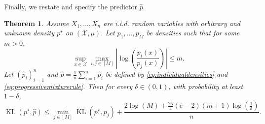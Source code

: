 \documentclass[11pt]{article}
\makeatletter
\renewcommand{\le}{\leqslant}
\newcommand{\M}{M}
\newcommand{\X}{\mathcal{X}}
\newcommand{\iid}{i.i.d.\@\xspace}
\newcommand{\kl}{\operatorname{KL}}
\newcommand{\kll}[2]{\kl ({#1}, {#2})}
\newtheorem{theorem}{Theorem}
\theoremstyle{definition}
\theoremstyle{remark}
\makeatother
\begin{document}
Finally, we restate  and specify the predictor $\widehat{p}$.
\begin{theorem}
  Assume $X_{1},\ldots,X_{n}$ are
\iid random variables with arbitrary and unknown density $p^\star$ on $(\X, \mu)$.
Let $p_{1},\ldots,p_{\M}$ be densities such that for some $m>0$,
\[
\sup_{x \in \X}\max_{i,j\in[M]}\left|\log\left(\frac{p_i(x)}{p_j(x)}\right)\right|\le m.
\]
Let $\left(\widehat p_i\right)_{i=1}^{n}$ and $\widehat p=\frac{1}{n}\sum_{i=1}^{n}\widehat p_i$ be defined by \eqref{eq:individualdensities} and \eqref{eq:progressivemixturerule}. Then for every $\delta\in(0,1)$, with probability at least $1-\delta$,
\[
\kll{p^\star}{\widehat{p}} \le \min_{j \in [M]}\kll{p^\star}{p_j} + \frac{2\log\left(M\right)+\frac{25}{4}\left(e-2\right)\left(m+1\right)\log\left(\frac{1}{\delta}\right)}{n} .
\]
\end{theorem}
\end{document}
